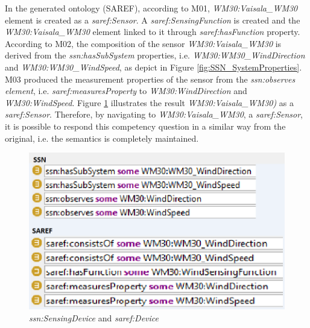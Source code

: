 \documentclass{sig-alternate-05-2015}
\begin{document}
In the generated ontology (SAREF), according to M01, \textit{WM30:\-Vaisala\-\_WM30} element is created as a \textit{saref:\-Sensor}. A \textit{saref:\-SensingFunction} is created and the \textit{WM30:\-Vaisala\-\_WM30} element linked to it through \textit{saref:\-hasFunction} property. According to M02, the composition of the sensor \textit{WM30:\-Vaisala\-\_WM30} is derived from the \textit{ssn:\-hasSubSystem} properties, i.e. \textit{WM30:\-WM30\-\_Wind\-Direction} and \textit{WM30:\-WM30\-\_WindSpeed}, as depict in Figure \ref{fig:SSN_SystemProperties}. M03 produced the measurement properties of the sensor from the \textit{ssn:\-observes element}, i.e. \textit{saref:\-measuresProperty} to \textit{WM30:\-WindDirection} and \textit{WM30:\-WindSpeed}. Figure \ref{fig:SAREF_Sensor_WM30} illustrates the result \textit{WM30:\-Vaisala\-\_WM30)} as a \textit{saref:\-Sensor}. Therefore, by navigating to \textit{WM30:\-Vaisala\-\_WM30}, a \textit{saref:\-Sensor}, it is possible to respond this competency question in a similar way from the original, i.e. the semantics is completely maintained.  
\begin{figure}[h!]
\centering
\includegraphics[scale=0.35]{WM30_SSNtoSAREF}
\caption{\textit{ssn:SensingDevice} and \textit{saref:Device}}
\label{fig:SAREF_Sensor_WM30}
\end{figure}
\end{document}
